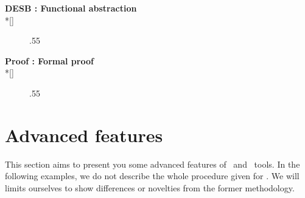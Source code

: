      \begin{minipage}[t]{\textwidth}
       {\bf DESB : Functional abstraction}\\*[\bigskipamount]
       \forceindent
       \begin{figure}[H]
         \begin{center}
           \leavevmode\epsfxsize.55\textwidth{}
         \end{center}
       \end{figure}
     \end{minipage}
     \begin{minipage}[t]{\textwidth}
       {\bf Proof : Formal proof}\\*[\bigskipamount]
       \forceindent
       \begin{figure}[H]
         \begin{center}
           \leavevmode\epsfxsize.55\textwidth{}
         \end{center}
       \end{figure}
     \end{minipage}
   \section{Advanced features}
   \begin{minipage}[t]{\textwidth}
     \forceindent
       This section aims to present you some advanced features of \fpgen\ 
     and \dpr\ tools. In the following examples, we do not describe the
     whole procedure given for \sampledpt. We will limits ourselves to show
     differences or novelties from the former methodology.
   \end{minipage}
